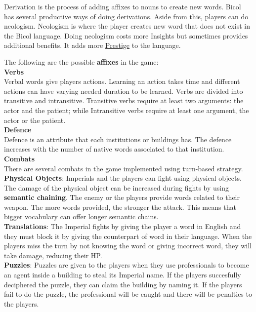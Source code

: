 \documentclass[11pt]{article}
\begin{document}
Derivation is the process of adding affixes to nouns to create new words. Bicol has several productive ways of doing derivations. Aside from this, players can do neologism. Neologism is where the player creates new word that does not exist in the Bicol language. Doing neologism costs more Insights but sometimes provides additional benefits. It adds more \hyperlink{prestige}{Prestige} to the language.

The following are the possible \textbf{affixes} in the game:\\


\textbf{Verbs}\\
Verbal words give players actions. Learning an action takes time and different actions can have varying needed duration to be learned. Verbs are divided into transitive and intransitive. Transitive verbs require at least two arguments: the actor and the patient; while Intransitive verbs require at least one argument, the actor or the patient.\\

\textbf{Defence}\\
Defence is an attribute that each institutions or buildings has. The defence increases with the number of native words associated to that institution.\\

\textbf{Combats}\\
There are several combats in the game implemented using turn-based strategy.\\
\textbf{Physical Objects}:
Imperials and the players can fight using physical objects. The damage of the physical object can be increased during fights by using \textbf{semantic chaining}. The enemy or the players provide words related to their weapon. The more words provided, the stronger the attack. This means that bigger vocabulary can offer longer semantic chains.\\
\textbf{Translations}:
The Imperial fights by giving the player a word in English and they must block it by giving the counterpart of word in their language. When the players miss the turn by not knowing the word or giving incorrect word, they will take damage, reducing their HP.\\
\textbf{Puzzles}:
Puzzles are given to the players when they use professionals to become an agent inside a building to steal its Imperial name. If the players succesfully deciphered the puzzle, they can claim the building by naming it. If the players fail to do the puzzle, the professional will be caught and there will be penalties to the players. \\
\end{document}
